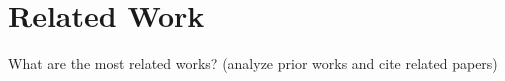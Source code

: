 \section{Related Work}
    What are the most related works? (analyze prior works and cite related papers)